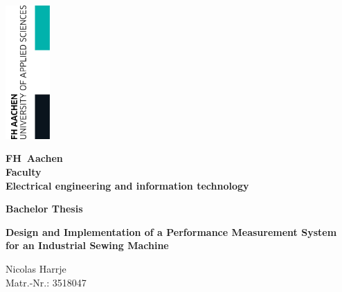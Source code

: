 \begin{titlepage}
	\thispagestyle{empty}

	\begin{flushright}
		\includegraphics[width=1.7cm]{./pic/FHAC.jpg}
	\end{flushright}

	\vspace{-2.5cm}

	\centering \sffamily \bfseries \Large FH~Aachen \\
	\vspace{0.5cm}
	\normalsize Faculty\\
	Electrical engineering and information technology

	\vspace{1cm}

	\centering \bfseries Bachelor Thesis

	\vspace{0.8cm}

	\centering \begin{minipage}[t]{17cm}
		\centering \bfseries \large Design and Implementation of  a Performance Measurement System\\ for an Industrial Sewing Machine
		\medskip
	\end{minipage}

	\vspace{1.5cm}

	\begin{minipage}[t]{9cm}
		\centering Nicolas Harrje \\ Matr.-Nr.: 3518047
	\end{minipage}


\end{titlepage}
